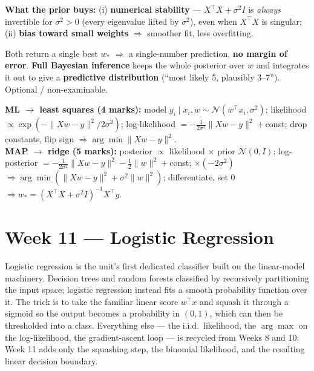 \documentclass[11pt, a4paper]{article}
\newcommand{\kw}[1]{\textbf{#1}}
\begin{document}
\textbf{What the prior buys:} (i) \kw{numerical stability} — $X^\top X+\sigma^2 I$ is \emph{always}
invertible for $\sigma^2>0$ (every eigenvalue lifted by $\sigma^2$), even when $X^\top X$ is singular;
(ii) \kw{bias toward small weights} $\Rightarrow$ smoother fit, less overfitting.

\begin{pitfallbox}
Both return a single best $w_\ast$ $\Rightarrow$ a single-number prediction, \kw{no margin of error}.
\kw{Full Bayesian inference} keeps the whole posterior over $w$ and integrates it out to give a
\kw{predictive distribution} (``most likely 5, plausibly 3–7''). Optional / non-examinable.
\end{pitfallbox}

\begin{exambox}
\textbf{ML $\to$ least squares (4 marks):} model $y_i\mid x_i,w\sim\mathcal N(w^\top x_i,\sigma^2)$;
likelihood $\propto\exp(-\|Xw-y\|^2/2\sigma^2)$; log-likelihood $=-\tfrac{1}{2\sigma^2}\|Xw-y\|^2+$const;
drop constants, flip sign $\Rightarrow\arg\min\|Xw-y\|^2$. \\
\textbf{MAP $\to$ ridge (5 marks):} posterior $\propto$ likelihood $\times$ prior $\mathcal N(0,I)$;
log-posterior $=-\tfrac{1}{2\sigma^2}\|Xw-y\|^2-\tfrac12\|w\|^2+$const; $\times(-2\sigma^2)$
$\Rightarrow\arg\min(\|Xw-y\|^2+\sigma^2\|w\|^2)$; differentiate, set $0$
$\Rightarrow w_\ast=(X^\top X+\sigma^2 I)^{-1}X^\top y$.
\end{exambox}

\section{Week 11 — Logistic Regression}

Logistic regression is the unit's first dedicated classifier built on the linear-model machinery.
Decision trees and random forests classified by recursively partitioning the input space; logistic
regression instead fits a smooth probability function over it. The trick is to take the familiar
linear score $w^\top x$ and squash it through a sigmoid so the output becomes a probability in
$(0,1)$, which can then be thresholded into a class. Everything else — the i.i.d.\ likelihood, the
$\arg\max$ on the log-likelihood, the gradient-ascent loop — is recycled from Weeks 8 and 10; Week 11
adds only the squashing step, the binomial likelihood, and the resulting linear decision boundary.
\end{document}
